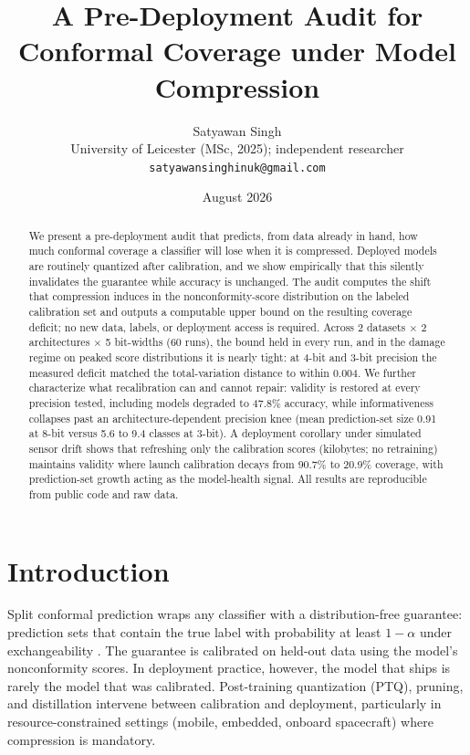 \documentclass[11pt]{article}
\title{A Pre-Deployment Audit for Conformal Coverage under Model Compression}
\author{Satyawan Singh\\
\small University of Leicester (MSc, 2025); independent researcher\\
\small \texttt{satyawansinghinuk@gmail.com}}
\date{August 2026}
\begin{document}
\maketitle

\begin{abstract}
We present a pre-deployment audit that predicts, from data already in hand,
how much conformal coverage a classifier will lose when it is compressed.
Deployed models are routinely quantized after calibration, and we show
empirically that this silently invalidates the guarantee while accuracy is
unchanged. The audit computes the shift that compression induces in the
nonconformity-score distribution on the labeled calibration set and outputs a
computable upper bound on the resulting coverage deficit; no new data, labels,
or deployment access is required. Across 2 datasets $\times$ 2 architectures $\times$ 5
bit-widths (60 runs), the bound held in every run, and in the damage regime on
peaked score distributions it is nearly tight: at 4-bit and 3-bit precision the
measured deficit matched the total-variation distance to within 0.004. We
further characterize what recalibration can and cannot repair: validity is
restored at every precision tested, including models degraded to 47.8\%
accuracy, while informativeness collapses past an architecture-dependent
precision knee (mean prediction-set size 0.91 at 8-bit versus 5.6 to 9.4 classes
at 3-bit). A deployment corollary under simulated sensor drift shows that
refreshing only the calibration scores (kilobytes; no retraining) maintains
validity where launch calibration decays from 90.7\% to 20.9\% coverage, with
prediction-set growth acting as the model-health signal. All results are
reproducible from public code and raw data.
\end{abstract}

\section{Introduction}

Split conformal prediction wraps any classifier with a distribution-free
guarantee: prediction sets that contain the true label with probability at
least $1-\alpha$ under exchangeability \citep{vovk2005,papadopoulos2002,angelopoulos2023}.
The guarantee is calibrated on held-out data using the model's nonconformity
scores. In deployment practice, however, the model that ships is rarely the
model that was calibrated. Post-training quantization (PTQ), pruning, and
distillation intervene between calibration and deployment, particularly in
resource-constrained settings (mobile, embedded, onboard spacecraft) where
compression is mandatory.
\end{document}

